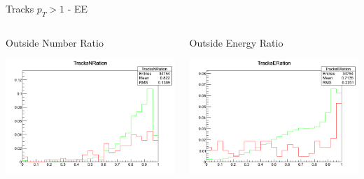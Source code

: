 \documentclass[8pt]{beamer}
\begin{document}
\begin{frame}{Tracks $p_T>1$ - EE}

\begin{columns}
 
\begin{block}{Outside Number Ratio}
 
\includegraphics[width=\linewidth]{img/EE_Tracks1_TracksNRatio.png}

\end{block}

\begin{block}{Outside Energy Ratio}
 
\includegraphics[width=\linewidth]{img/EE_Tracks1_TracksERatio.png}
 
\end{block}

\end{columns}

\end{frame}
\end{document}
